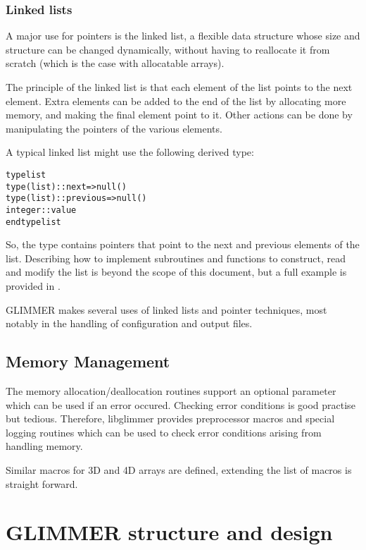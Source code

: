 \subsubsection{Linked lists}
%
A major use for pointers is the linked list, a flexible data structure whose
size and structure can be changed dynamically, without having to reallocate it
from scratch (which is the case with allocatable arrays).

The principle of the linked list is that each element of the list points to
the next element. Extra elements can be added to the end of the list by
allocating more memory, and making the final element point to it. Other
actions can be done by manipulating the pointers of the various elements.

A typical linked list might use the following derived type:
%
\begin{alltt}
    type list
        type(list) :: next => null()
        type(list) :: previous => null()
        integer :: value
    end type list
\end{alltt}
%
So, the type contains pointers that point to the next and previous elements
of the list. Describing how to implement subroutines and functions to
construct, read and modify the list is beyond the scope of this document, but
a full example is provided in \cite{Metcalf1999}.

GLIMMER makes several uses of linked lists and pointer techniques, most
notably in the handling of configuration and output files.
%

\subsection{Memory Management}
The memory allocation/deallocation routines support an optional parameter which can be used if an error occured. Checking error conditions is good practise but tedious. Therefore, libglimmer provides preprocessor macros and special logging routines which can be used to check error conditions arising from handling memory.
\lstset{numbers=left,numberstyle=\tiny,language=Fortran}

Similar macros for 3D and 4D arrays are defined, extending the list of macros is straight forward.
\section{GLIMMER structure and design}
%
